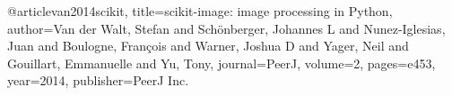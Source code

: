 @article{van2014scikit, 
  title={scikit-image: image processing in Python}, 
  author={Van der Walt, Stefan and Sch{\"o}nberger, Johannes L and Nunez-Iglesias, Juan and Boulogne, Fran{\c{c}}ois and Warner, Joshua D and Yager, Neil and Gouillart, Emmanuelle and Yu, Tony}, 
  journal={PeerJ}, 
  volume={2}, 
  pages={e453}, 
  year={2014}, 
  publisher={PeerJ Inc.} }

